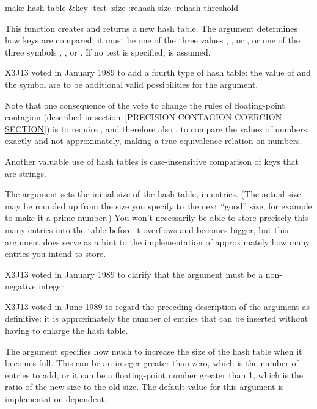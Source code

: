 \begin{defun}[Function]
make-hash-table &key :test :size :rehash-size :rehash-threshold

This function creates and returns a new hash table.
The  argument determines how keys are compared;
it must be one of the three values , , or ,
or one of the three symbols , , or .
If no test is specified,  is assumed.

\begin{new}
X3J13 voted in January 1989
to add a fourth type of hash table:
the value of  and the symbol  are to be additional
valid possibilities for the  argument.

Note that one consequence of
the vote to change the rules of
floating-point contagion
(described in section~\ref{PRECISION-CONTAGION-COERCION-SECTION})
is to require \cdf{=}, and therefore also ,
to compare the values of numbers exactly and not approximately, making
 a true equivalence relation on numbers.

Another valuable use of  hash tables is case-insensitive
comparison of keys that are strings.
\end{new}

The  argument
sets the initial size of the hash table, in entries.
(The actual size may be rounded up from the size
you specify to the next ``good'' size, for example to make it a prime number.)
You won't necessarily be able to store precisely
this many entries into the table
before it overflows and becomes bigger, but this argument does serve
as a hint to the implementation of approximately
how many entries you intend to store.

\begin{new}
X3J13 voted in January 1989
to clarify that the  argument
must be a non-negative integer.
\end{new}

\begin{newer}
X3J13 voted in June 1989  to regard the
preceding description of the  argument as definitive: it
is approximately the number of entries that can be inserted
without having to enlarge the hash table.
\end{newer}

The  argument
specifies how much to increase the size of the hash table when it becomes
full.  This can be an integer greater than zero,
which is the number of entries to add, or
it can be a floating-point number greater than 1,
which is the ratio of the new size to the old size.
The default value for this argument is implementation-dependent.


\end{defun}

